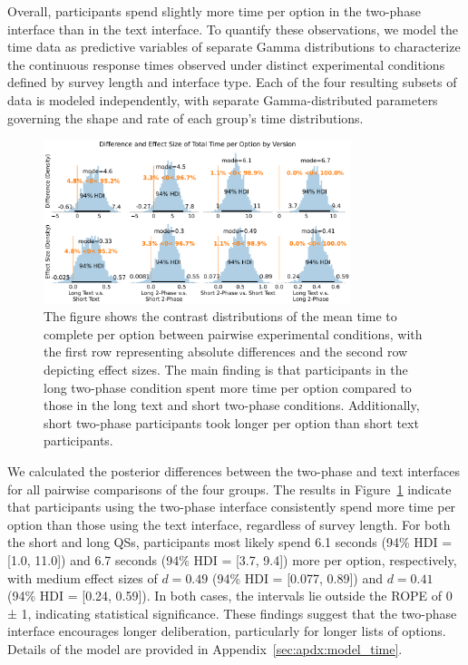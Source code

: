 Overall, participants spend slightly more time per option in the two-phase interface than in the text interface. To quantify these observations, we model the time data as predictive variables of separate Gamma distributions to characterize the continuous response times observed under distinct experimental conditions defined by survey length and interface type. Each of the four resulting subsets of data is modeled independently, with separate Gamma-distributed parameters governing the shape and rate of each group's time distributions. 

\begin{figure}[h]
    \centering
    \includegraphics[width=0.8\textwidth]{content/image/time/time_diff_per_option_effect_size_by_version}
    \captionsetup{width=0.8\textwidth, justification=justified}
    \caption{The figure shows the contrast distributions of the mean time to complete per option between pairwise experimental conditions, with the first row representing absolute differences and the second row depicting effect sizes. The main finding is that participants in the long two-phase condition spent more time per option compared to those in the long text and short two-phase conditions. Additionally, short two-phase participants took longer per option than short text participants.}
    \label{fig:time_per_option_bayesian}
\end{figure}

We calculated the posterior differences between the two-phase and text interfaces for all pairwise comparisons of the four groups. The results in Figure~\ref{fig:time_per_option_bayesian} indicate that participants using the two-phase interface consistently spend more time per option than those using the text interface, regardless of survey length. For both the short and long QSs, participants most likely spend 6.1 seconds (94\% HDI = [1.0, 11.0]) and 6.7 seconds (94\% HDI = [3.7, 9.4]) more per option, respectively, with medium effect sizes of $d=0.49$ (94\% HDI = [0.077, 0.89]) and $d=0.41$ (94\% HDI = [0.24, 0.59]). In both cases, the intervals lie outside the ROPE of 0 ± 1, indicating statistical significance. These findings suggest that the two-phase interface encourages longer deliberation, particularly for longer lists of options. Details of the model are provided in Appendix~\ref{sec:apdx:model_time}.

